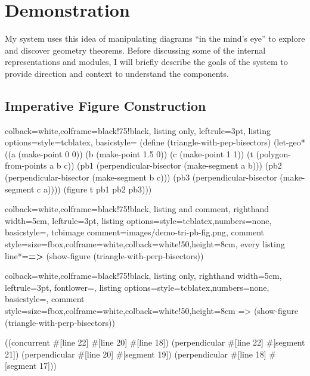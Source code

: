 \chapter{Demonstration}
\label{chap:demo}

My system uses this idea of manipulating diagrams ``in the mind's
eye'' to explore and discover geometry theorems. Before discussing
some of the internal representations and modules, I will briefly
describe the goals of the system to provide direction and context to
understand the components.

\section{Imperative Figure Construction}

\begin{tcblisting}{colback=white,colframe=black!75!black,
listing only,
leftrule=3pt,
listing options={style=tcblatex,
basicstyle=\footnotesize\ttfamily}}
(define (triangle-with-pep-bisectors)
  (let-geo* ((a (make-point 0 0))
             (b (make-point 1.5 0))
             (c (make-point 1 1))
             (t (polygon-from-points a b c))
             (pb1 (perpendicular-bisector (make-segment a b)))
             (pb2 (perpendicular-bisector (make-segment b c)))
             (pb3 (perpendicular-bisector (make-segment c a))))
    (figure t pb1 pb2 pb3)))
\end{tcblisting}

\begin{tcblisting}{colback=white,colframe=black!75!black,
listing and comment, righthand width=5cm,
leftrule=3pt,
listing options={style=tcblatex,numbers=none,
basicstyle=\footnotesize\ttfamily},
tcbimage comment={images/demo-tri-pb-fig.png},
comment style={size=fbox,colframe=white,colback=white!50,height=8cm},
every listing line*={\textcolor{black}{\small\ttfamily\bfseries => }}}
(show-figure (triangle-with-perp-bisectors))
\end{tcblisting}



\begin{tcblisting}{colback=white,colframe=black!75!black,
listing only, righthand width=5cm,
leftrule=3pt,
fontlower=\ttfamily,
listing options={style=tcblatex,numbers=none,
basicstyle=\footnotesize\ttfamily},
comment style={size=fbox,colframe=white,colback=white!50,height=8cm}}
=> (show-figure (triangle-with-perp-bisectors))

((concurrent #[line 22] #[line 20] #[line 18])
 (perpendicular #[line 22] #[segment 21])
 (perpendicular #[line 20] #[segment 19])
 (perpendicular #[line 18] #[segment 17]))
\end{tcblisting}



